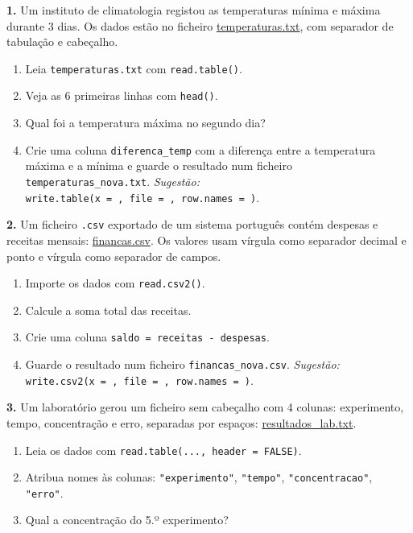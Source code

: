 \documentclass[
  portuguese,
  11pt,
  openany]{book}
\begin{document}
\textbf{1.} Um instituto de climatologia registou as temperaturas mínima e máxima durante
3 dias. Os dados estão no ficheiro
\href{docs/temperaturas.txt}{temperaturas.txt}, com separador de tabulação e cabeçalho.

\begin{enumerate}
\def\labelenumi{(\alph{enumi})}
\item
  Leia \texttt{temperaturas.txt} com \texttt{read.table()}.
\item
  Veja as 6 primeiras linhas com \texttt{head()}.
\item
  Qual foi a temperatura máxima no segundo dia?
\item
  Crie uma coluna \texttt{diferenca\_temp} com a diferença entre a temperatura máxima e a
  mínima e guarde o resultado num ficheiro \texttt{temperaturas\_nova.txt}. \emph{Sugestão:}
  \texttt{write.table(x\ =\ ,\ file\ =\ ,\ row.names\ =\ )}.
\end{enumerate}

\textbf{2.} Um ficheiro \texttt{.csv} exportado de um sistema português contém despesas e
receitas mensais: \href{docs/financas.csv}{financas.csv}. Os valores usam vírgula como
separador decimal e ponto e vírgula como separador de campos.

\begin{enumerate}
\def\labelenumi{(\alph{enumi})}
\item
  Importe os dados com \texttt{read.csv2()}.
\item
  Calcule a soma total das receitas.
\item
  Crie uma coluna \texttt{saldo\ =\ receitas\ -\ despesas}.
\item
  Guarde o resultado num ficheiro \texttt{financas\_nova.csv}. \emph{Sugestão:}
  \texttt{write.csv2(x\ =\ ,\ file\ =\ ,\ row.names\ =\ )}.
\end{enumerate}

\textbf{3.} Um laboratório gerou um ficheiro sem cabeçalho com 4 colunas: experimento,
tempo, concentração e erro, separadas por espaços:
\href{docs/resultados_lab.txt}{resultados\_lab.txt}.

\begin{enumerate}
\def\labelenumi{(\alph{enumi})}
\item
  Leia os dados com \texttt{read.table(...,\ header\ =\ FALSE)}.
\item
  Atribua nomes às colunas: \texttt{"experimento"}, \texttt{"tempo"}, \texttt{"concentracao"},
  \texttt{"erro"}.
\item
  Qual a concentração do 5.º experimento?
\end{enumerate}
\end{document}
